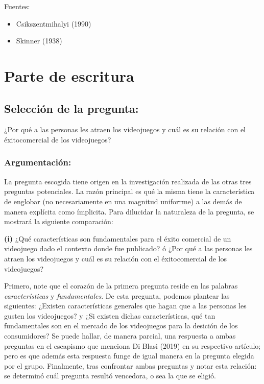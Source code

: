 \documentclass[
  letterpaper,
  DIV=11,
  numbers=noendperiod]{scrreprt}
\begin{document}
Fuentes:

\begin{itemize}
\item
  Csikszentmihalyi (1990)
\item
  Skinner (1938)
\end{itemize}


\chapter{Parte de escritura}\label{parte-de-escritura}

\section{Selección de la pregunta:}\label{selecciuxf3n-de-la-pregunta}

¿Por qué a las personas les atraen los videojuegos y cuál es su relación
con el éxitocomercial de los videojuegos?

\subsection{Argumentación:}\label{argumentaciuxf3n}

La pregunta escogida tiene origen en la investigación realizada de las
otras tres preguntas potenciales. La razón principal es qué la misma
tiene la característica de englobar (no necesariamente en una magnitud
uniforrme) a las demás de manera explícita como ímplicita. Para
dilucidar la naturaleza de la pregunta, se mostrará la siguiente
comparación:

\textbf{(i)} ¿Qué características son fundamentales para el éxito
comercial de un videojuego dado el contexto donde fue publicado? ó ¿Por
qué a las personas les atraen los videojuegos y cuál es su relación con
el éxitocomercial de los videojuegos?

Primero, note que el corazón de la primera pregunta reside en las
palabras \emph{características} y \emph{fundamentales}. De esta
pregunta, podemos plantear las siguientes: ¿Existen características
generales que hagan que a las personas les gusten los videojuegos? y ¿Si
existen dichas características, qué tan fundamentales son en el mercado
de los videojuegos para la desición de los consumidores? Se puede
hallar, de manera parcial, una respuesta a ambas preguntas en el
escapismo que menciona Di Blasi (2019) en su respectivo artículo; pero
es que además esta respuesta funge de igual manera en la pregunta
elegida por el grupo. Finalmente, tras confrontar ambas preguntas y
notar esta relación: se determinó cuál pregunta resultó vencedora, o sea
la que se eligió.
\end{document}
